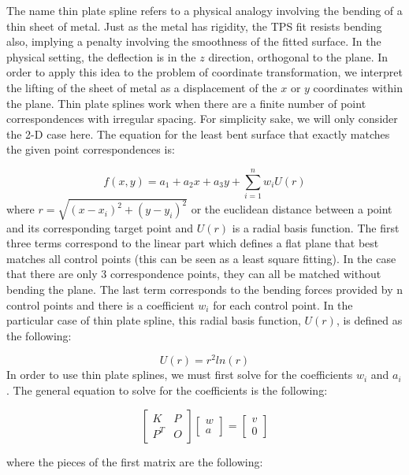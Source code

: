 The name thin plate spline refers to a physical analogy involving the bending of a thin sheet of metal. Just as the metal has rigidity, the TPS fit resists bending also, implying a penalty involving the smoothness of the fitted surface. In the physical setting, the deflection is in the $z$ direction, orthogonal to the plane. In order to apply this idea to the problem of coordinate transformation, we interpret the lifting of the sheet of metal as a displacement of the $x$ or $y$ coordinates within the plane. Thin plate splines work when there are a finite number of point correspondences with irregular spacing. For simplicity sake, we will only consider the 2-D case here. The equation for the least bent surface that exactly matches the given point correspondences is: 

\begin{equation}
f(x,y) = a_1 + a_2x + a_3y + \sum_{i=1}^{n} w_i U(r)
\label{eq:TPS}
\end{equation}
where $r = \sqrt{(x-x_i)^2 + (y-y_i)^2}$ or the euclidean distance between a point and its corresponding target point and $U(r)$ is a radial basis function. The first three terms correspond to the linear part which defines a flat plane that best matches all control points (this can be seen as a least square fitting). In the case that there are only 3 correspondence points, they can all be matched without bending the plane. The last term corresponds to the bending forces provided by n control points and there is a coefficient $w_i$ for each control point.  In the particular case of thin plate spline, this radial basis function, $U(r)$,  is defined as the following:

\begin{equation}
U(r) = r^2 ln(r)
\end{equation}
In order to use thin plate splines, we must first solve for the coefficients $w_i$ and $a_i$. The general equation to solve for the coefficients is the following:

\begin{center}
	\begin{equation}
	\begin{bmatrix}
	K   & P\\
	P^T & O
	\end{bmatrix}
	\begin{bmatrix}
	w  \\
	a  
	\end{bmatrix}
	=
	\begin{bmatrix}
	v  \\
	0  
	\end{bmatrix}
	\end{equation}
	\label{eq:TPSLinalg}
\end{center}
where the pieces of the first matrix are the following:

